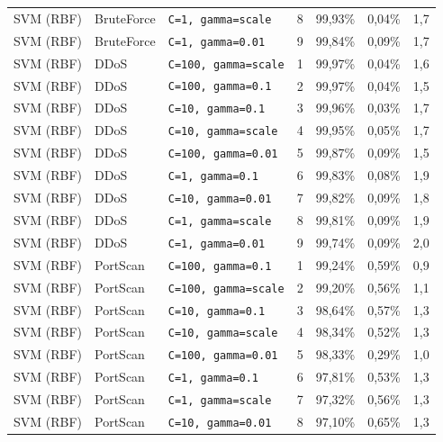 {{\begin{tabularx}{\textwidth}{@{}llLrrrr@{}}
SVM (RBF) & BruteForce & \scriptsize\texttt{C=1, gamma=scale} & 8 & 99,93\% & 0,04\% & 1,7\\
SVM (RBF) & BruteForce & \scriptsize\texttt{C=1, gamma=0.01} & 9 & 99,84\% & 0,09\% & 1,7\\
SVM (RBF) & DDoS & \scriptsize\texttt{C=100, gamma=scale} & 1 & 99,97\% & 0,04\% & 1,6\\
SVM (RBF) & DDoS & \scriptsize\texttt{C=100, gamma=0.1} & 2 & 99,97\% & 0,04\% & 1,5\\
SVM (RBF) & DDoS & \scriptsize\texttt{C=10, gamma=0.1} & 3 & 99,96\% & 0,03\% & 1,7\\
SVM (RBF) & DDoS & \scriptsize\texttt{C=10, gamma=scale} & 4 & 99,95\% & 0,05\% & 1,7\\
SVM (RBF) & DDoS & \scriptsize\texttt{C=100, gamma=0.01} & 5 & 99,87\% & 0,09\% & 1,5\\
SVM (RBF) & DDoS & \scriptsize\texttt{C=1, gamma=0.1} & 6 & 99,83\% & 0,08\% & 1,9\\
SVM (RBF) & DDoS & \scriptsize\texttt{C=10, gamma=0.01} & 7 & 99,82\% & 0,09\% & 1,8\\
SVM (RBF) & DDoS & \scriptsize\texttt{C=1, gamma=scale} & 8 & 99,81\% & 0,09\% & 1,9\\
SVM (RBF) & DDoS & \scriptsize\texttt{C=1, gamma=0.01} & 9 & 99,74\% & 0,09\% & 2,0\\
SVM (RBF) & PortScan & \scriptsize\texttt{C=100, gamma=0.1} & 1 & 99,24\% & 0,59\% & 0,9\\
SVM (RBF) & PortScan & \scriptsize\texttt{C=100, gamma=scale} & 2 & 99,20\% & 0,56\% & 1,1\\
SVM (RBF) & PortScan & \scriptsize\texttt{C=10, gamma=0.1} & 3 & 98,64\% & 0,57\% & 1,3\\
SVM (RBF) & PortScan & \scriptsize\texttt{C=10, gamma=scale} & 4 & 98,34\% & 0,52\% & 1,3\\
SVM (RBF) & PortScan & \scriptsize\texttt{C=100, gamma=0.01} & 5 & 98,33\% & 0,29\% & 1,0\\
SVM (RBF) & PortScan & \scriptsize\texttt{C=1, gamma=0.1} & 6 & 97,81\% & 0,53\% & 1,3\\
SVM (RBF) & PortScan & \scriptsize\texttt{C=1, gamma=scale} & 7 & 97,32\% & 0,56\% & 1,3\\
SVM (RBF) & PortScan & \scriptsize\texttt{C=10, gamma=0.01} & 8 & 97,10\% & 0,65\% & 1,3\\

\end{tabularx}}}
